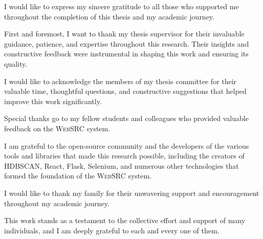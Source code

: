 \documentclass[12pt,a4paper,oneside]{book}
\newcommand{\name}{\textsc{WebSRC}}
\begin{document}
I would like to express my sincere gratitude to all those who supported me throughout the completion of this thesis and my academic journey.

First and foremost, I want to thank my thesis supervisor for their invaluable guidance, patience, and expertise throughout this research. Their insights and constructive feedback were instrumental in shaping this work and ensuring its quality.

I would like to acknowledge the members of my thesis committee for their valuable time, thoughtful questions, and constructive suggestions that helped improve this work significantly.

Special thanks go to my fellow students and colleagues who provided valuable feedback on the {\name} system.

I am grateful to the open-source community and the developers of the various tools and libraries that made this research possible, including the creators of HDBSCAN, React, Flask, Selenium, and numerous other technologies that formed the foundation of the {\name} system.

I would like to thank my family for their unwavering support and encouragement throughout my academic journey.

This work stands as a testament to the collective effort and support of many individuals, and I am deeply grateful to each and every one of them.

\newpage
\tableofcontents
\listoffigures
\listoftables

\mainmatter
\pagestyle{fancy}








\appendix





\end{document}
